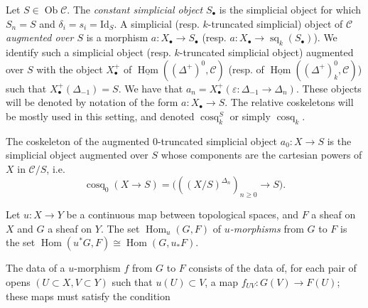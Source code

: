     
  \label{hodge-theory-iii-5.1.3}\par{}Let \(S\in \operatorname {Ob}\mathscr {C}\).
    The \emph{constant simplicial object} \(S_\bullet \) is the simplicial object for which \(S_n=S\) and \(\delta _i=s_i=\mathrm {Id}_S\).
    A simplicial (resp. \(k\)-truncated simplicial) object of \(\mathscr {C}\) \emph{augmented over \(S\)} is a morphism \(a\colon  X_\bullet \to  S_\bullet \) (resp. \(a\colon  X_\bullet \to \operatorname {sq}_k(S_\bullet )\)).
    We identify such a simplicial object (resp. \(k\)-truncated simplicial object) augmented over \(S\) with the object \(X_\bullet ^+\) of \(\underline {\operatorname {Hom}}((\Delta ^+)^0,\mathscr {C})\) (resp. of \(\underline {\operatorname {Hom}}((\Delta ^+)_k^0,\mathscr {C})\)) such that \(X_\bullet ^+(\Delta _{-1})=S\).
    We have that \(a_n=X_\bullet ^+(\varepsilon \colon \Delta _{-1}\to \Delta _n)\).
    These objects will be denoted by notation of the form \(a\colon  X_\bullet \to  S\).
    The relative coskeletons will be mostly used in this setting, and denoted \(\operatorname {cosq}_k^S\) or simply \(\operatorname {cosq}_k\).\label{hodge-theory-iii-5.1.4}\par{}The coskeleton of the augmented \(0\)-truncated simplicial object \(a_0\colon  X\to  S\) is the simplicial object augmented over \(S\) whose components are the cartesian powers of \(X\) in \(\mathscr {C}/S\), i.e.
    \[       \operatorname {cosq}_0(X\to  S)       = \big ( ((X/S)^{\Delta _n})_{n\geqslant 0} \to  S \big ).     \]\label{hodge-theory-iii-5.1.5}\par{}Let \(u\colon  X\to  Y\) be a continuous map between topological spaces, and \(F\) a sheaf on \(X\) and \(G\) a sheaf on \(Y\).
    The set \(\operatorname {Hom}_u(G,F)\) of \emph{\(u\)-morphisms} from \(G\) to \(F\) is the set \(\operatorname {Hom}(u^*G,F)\cong \operatorname {Hom}(G,u_*F)\).\par{}The data of a \(u\)-morphism \(f\) from \(G\) to \(F\) consists of the data of, for each pair of opens \((U\subset  X,V\subset  Y)\) such that \(u(U)\subset  V\), a map \(f_{UV}\colon  G(V)\to  F(U)\);
    these maps must satisfy the condition

